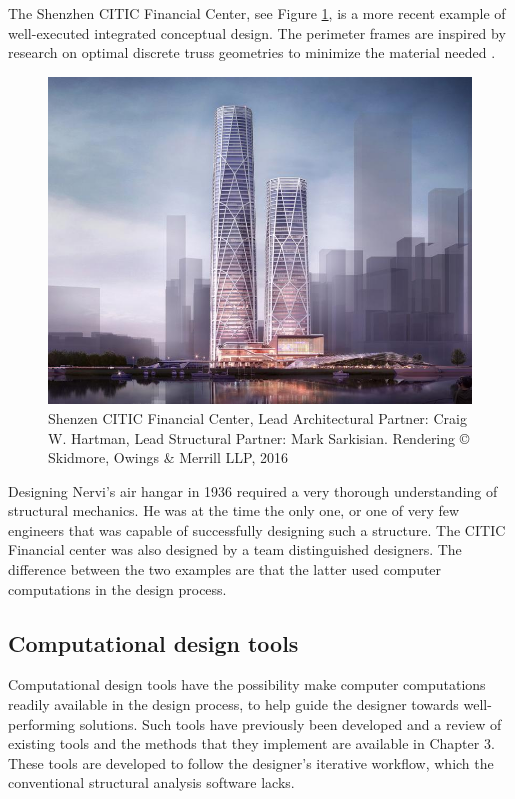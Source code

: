 The Shenzhen CITIC Financial Center, see Figure \ref{fig:Shenzen}, is a more recent example of well-executed integrated conceptual design. The perimeter frames are inspired by research on optimal discrete truss geometries to minimize the material needed \cite{Stromberg2012a}.

\begin{figure}
  \includegraphics[width=350pt]{graphics/shenzen.jpg}
  \caption{Shenzen CITIC Financial Center, Lead Architectural Partner: Craig W. Hartman, Lead Structural Partner: Mark Sarkisian.  Rendering © Skidmore, Owings \& Merrill LLP, 2016}
  \label{fig:Shenzen}
\end{figure}

Designing Nervi’s air hangar in 1936 required a very thorough understanding of structural mechanics. He was at the time the only one, or one of very few engineers that was capable of successfully designing such a structure. The CITIC Financial center was also designed by a team distinguished designers. The difference between the two examples are that the latter used computer computations in the design process. 

\subsection{Computational design tools}
Computational design tools have the possibility make computer computations readily available in the design process, to help guide the designer towards well-performing solutions. Such tools have previously been developed and a review of existing tools and the methods that they implement are available in Chapter 3. These tools are developed to follow the designer’s iterative workflow, which the conventional structural analysis software lacks. 

